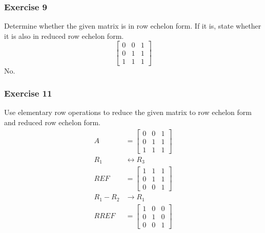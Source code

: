 \documentclass{math}
\begin{document}
\subsubsection*{Exercise 9}
Determine whether the given matrix is in row echelon form. If it is, state
whether it is also in reduced row echelon form.
\[ \begin{bmatrix}
  0 & 0 & 1 \\
  0 & 1 & 1 \\
  1 & 1 & 1
\end{bmatrix} \]
No.

\subsubsection*{Exercise 11}
Use elementary row operations to reduce the given matrix to row echelon form
and reduced row echelon form.
\begin{align*}
  A &= \begin{bmatrix}
    0 & 0 & 1 \\
    0 & 1 & 1 \\
    1 & 1 & 1
  \end{bmatrix} \\
  R_1 &\leftrightarrow R_3 \\
  REF &= \begin{bmatrix}
    1 & 1 & 1 \\
    0 & 1 & 1 \\
    0 & 0 & 1
  \end{bmatrix} \\
  R_1-R_2 &\to R_1 \\
  RREF &= \begin{bmatrix}
    1 & 0 & 0 \\
    0 & 1 & 0 \\
    0 & 0 & 1
  \end{bmatrix}
\end{align*}
\end{document}
